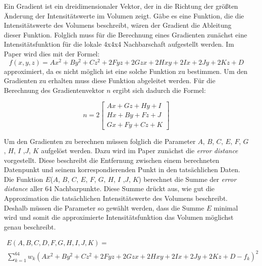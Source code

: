 Ein Gradient ist ein dreidimensionaler Vektor, der in die Richtung der größten Änderung der Intensitätswerte im Volumen zeigt. Gäbe es eine Funktion, die die Intensitätswerte des Volumens beschreibt, wären der Gradient die Ableitung dieser Funktion. Folglich muss für die Berechnung eines Gradienten zunächst eine Intensitätsfunktion für die lokale 4x4x4 Nachbarschaft aufgestellt werden. Im Paper wird dies mit der Formel:
\begin{equation}
	f(x,y,z) = Ax^{2}+By^{2}+Cz^{2}+2Fyz+2Gzx+2Hxy+2Ix+2Jy+2Kz+D
\end{equation}
approximiert, da es nicht möglich ist eine solche Funktion zu bestimmen. Um den Gradienten zu erhalten muss diese Funktion abgeleitet werden. Für die Berechnung des Gradientenvektor $n$ ergibt sich dadurch die Formel:


\begin{equation}
	n =2\begin{bmatrix}
           Ax + Gz + Hy + I \\
           Hx + By + Fz + J \\
           Gx + Fy + Cz + K
         \end{bmatrix} 
\end{equation}

Um den Gradienten zu berechnen müssen folglich die Parameter $A$, $B$, $C$, $E$, $F$, $G$, $H$, $I$ ,$J$, $K$ aufgelöst werden. Dazu wird im Paper zunächst die \textit{error distance} vorgestellt. Diese beschreibt die Entfernung zwischen einem berechneten Datenpunkt und seinem korrespondierenden Punkt in den tatsächlichen Daten. Die Funktion $E$($A$, $B$, $C$, $E$, $F$, $G$, $H$, $I$ ,$J$, $K$) berechnet die Summe der \textit{error distance} aller 64 Nachbarpunkte. Diese Summe drückt aus, wie gut die Approximation die tatsächlichen Intensitätswerte des Volumens beschreibt. Deshalb müssen die Parameter so gewählt werden, dass die Summe $E$ minimal wird und somit die approximierte Intensitätsfunktion das Volumen möglichst genau beschreibt.


\begin{equation}
\begin{array}{l}
  E(A,B,C,D,F,G,H,I,J,K) = \\
	\sum\limits_{k=1}^{64}  w_{k}(Ax^{2}+By^{2}+Cz^{2}+2Fyz+2Gzx+2Hxy+2Ix+2Jy+2Kz+D - f_{k})^2
\end{array}
\end{equation}


